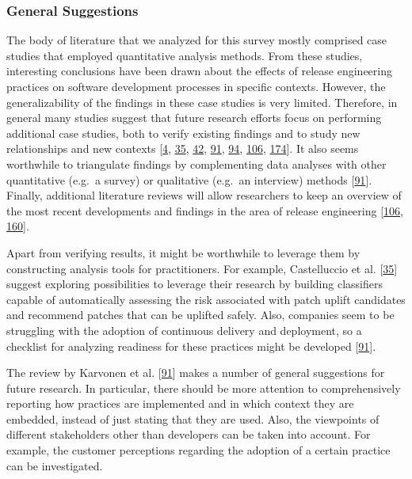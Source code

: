 \documentclass[]{book}
\begin{document}
\subsubsection{General Suggestions}\label{general-suggestions}

The body of literature that we analyzed for this survey mostly comprised
case studies that employed quantitative analysis methods. From these
studies, interesting conclusions have been drawn about the effects of
release engineering practices on software development processes in
specific contexts. However, the generalizability of the findings in
these case studies is very limited. Therefore, in general many studies
suggest that future research efforts focus on performing additional case
studies, both to verify existing findings and to study new relationships
and new contexts {[}\protect\hyperlink{ref-adams2016a}{4},
\protect\hyperlink{ref-castelluccio2017a}{35},
\protect\hyperlink{ref-claes2017a}{42},
\protect\hyperlink{ref-karvonen2017a}{91},
\protect\hyperlink{ref-khomh2015a}{94},
\protect\hyperlink{ref-laukkanen2018a}{106},
\protect\hyperlink{ref-teixeira2017a}{174}{]}. It also seems worthwhile
to triangulate findings by complementing data analyses with other
quantitative (e.g.~a survey) or qualitative (e.g.~an interview) methods
{[}\protect\hyperlink{ref-karvonen2017a}{91}{]}. Finally, additional
literature reviews will allow researchers to keep an overview of the
most recent developments and findings in the area of release engineering
{[}\protect\hyperlink{ref-laukkanen2018a}{106},
\protect\hyperlink{ref-rodriguez2017a}{160}{]}.

Apart from verifying results, it might be worthwhile to leverage them by
constructing analysis tools for practitioners. For example, Castelluccio
et al. {[}\protect\hyperlink{ref-castelluccio2017a}{35}{]} suggest
exploring possibilities to leverage their research by building
classifiers capable of automatically assessing the risk associated with
patch uplift candidates and recommend patches that can be uplifted
safely. Also, companies seem to be struggling with the adoption of
continuous delivery and deployment, so a checklist for analyzing
readiness for these practices might be developed
{[}\protect\hyperlink{ref-karvonen2017a}{91}{]}.

The review by Karvonen et al.
{[}\protect\hyperlink{ref-karvonen2017a}{91}{]} makes a number of
general suggestions for future research. In particular, there should be
more attention to comprehensively reporting how practices are
implemented and in which context they are embedded, instead of just
stating that they are used. Also, the viewpoints of different
stakeholders other than developers can be taken into account. For
example, the customer perceptions regarding the adoption of a certain
practice can be investigated.
\end{document}
